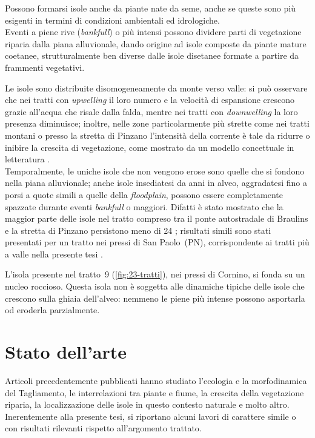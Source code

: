 Possono formarsi isole anche da piante nate da seme, anche se queste sono più esigenti in termini di condizioni ambientali ed idrologiche.
\\
Eventi a piene rive (\emph{bankfull}) o più intensi possono dividere parti di vegetazione riparia dalla piana alluvionale, dando origine ad isole composte da piante mature coetanee, strutturalmente ben diverse dalle isole disetanee formate a partire da frammenti vegetativi.

Le isole sono distribuite disomogeneamente da monte verso valle: si può osservare che nei tratti con \emph{upwelling} il loro numero e la velocità di espansione crescono grazie all'acqua che risale dalla falda, mentre nei tratti con \emph{downwelling} la loro presenza diminuisce;
inoltre, nelle zone particolarmente più strette come nei tratti montani o presso la stretta di Pinzano l'intensità della corrente è tale da ridurre o inibire la crescita di vegetazione, come mostrato da un modello concettuale in letteratura .
\\
Temporalmente, le uniche isole che non vengono erose sono quelle che si fondono nella piana alluvionale; anche isole insediatesi da anni in alveo, aggradatesi fino a porsi a quote simili a quelle della \emph{floodplain}, possono essere completamente spazzate durante eventi \emph{bankfull} o maggiori.
Difatti è stato mostrato che la maggior parte delle isole nel tratto compreso tra il ponte autostradale di Braulins e la stretta di Pinzano persistono meno di \SI{24}{\anni} ; risultati simili sono stati presentati per un tratto nei pressi di San Paolo~(PN), corrispondente ai tratti più a valle nella presente tesi .

L'isola presente nel tratto~9 (\cref{fig:23-tratti}), nei pressi di Cornino, si fonda su un nucleo roccioso.
Questa isola non è soggetta alle dinamiche tipiche delle isole che crescono sulla ghiaia dell'alveo: nemmeno le piene più intense possono asportarla od eroderla parzialmente.


\section{Stato dell'arte}
Articoli precedentemente pubblicati hanno studiato l'ecologia e la morfodinamica del Tagliamento, le interrelazioni tra piante e fiume, la crescita della vegetazione riparia, la localizzazione delle isole in questo contesto naturale e molto altro.
\\
Inerentemente alla presente tesi, si riportano alcuni lavori di carattere simile o con risultati rilevanti rispetto all'argomento trattato.

